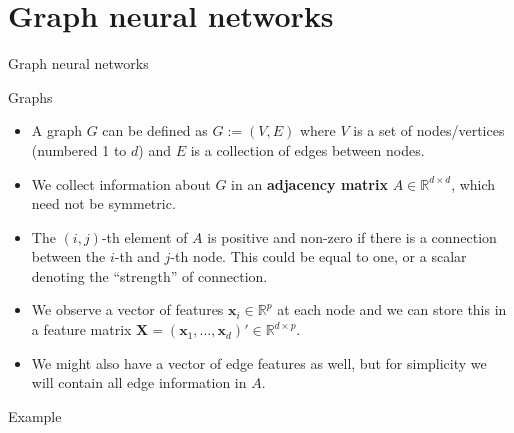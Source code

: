 \documentclass{beamer}
\begin{document}
\section{Graph neural networks}
\begin{frame}
\begin{center}
\Huge Graph neural networks
\end{center}
\end{frame}
\begin{frame}{Graphs}
\begin{itemize}
\item A graph $G$ can be defined as $G:=(V,E)$ where $V$ is a set of nodes/vertices (numbered 1 to $d$) and $E$ is a collection of edges between nodes.
\item We collect information about $G$ in an \textbf{adjacency matrix} $A\in\mathbb{R}^{d \times d}$, which need not be symmetric.
\item The $(i,j)$-th element of $A$ is positive and non-zero if there is a connection between the $i$-th and $j$-th node. This could be equal to one, or a scalar denoting the ``strength'' of connection. 
\item We observe a vector of features $\mathbf{x}_i \in \mathbb{R}^p$ at each node and we can store this in a feature matrix $\mathbf{X}=(\mathbf{x}_1, \dots,\mathbf{x}_d)'\in\mathbb{R}^{d\times p}$.
\item We might also have a vector of edge features as well, but for simplicity we will contain all edge information in $A$.
\end{itemize}
\end{frame}


\begin{frame}{Example}

\end{frame}
\end{document}
